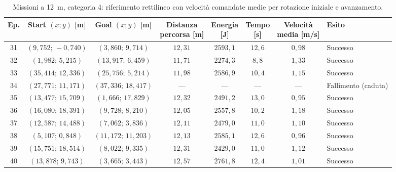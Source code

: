 \begin{table}[H]
\centering
\caption{Missioni a 12~m, categoria 4: riferimento rettilineo con velocità comandate medie per rotazione iniziale e avanzamento.}
\label{tab:big-map-12m-baseline-cat4}
\begingroup
\fontsize{9}{11}\selectfont
\setlength{\tabcolsep}{2.5pt}
\renewcommand{\arraystretch}{1.2}
\begin{tabular}{@{}c cc cccc l@{}}
\toprule
Ep. & \shortstack{Start $(x;y)$\\{}[m]} & \shortstack{Goal $(x;y)$\\{}[m]} & \shortstack{Distanza\\percorsa [m]} & \shortstack{Energia\\{}[J]} & \shortstack{Tempo\\{}[s]} & \shortstack{Velocità\\media [m/s]} & Esito \\
\midrule
31 & $(9{,}752;\,-0{,}740)$ & $(3{,}860;\,9{,}714)$ & $12{,}31$ & $2593{,}1$ & $12{,}6$ & $0{,}98$ & Successo \\
32 & $(1{,}982;\,5{,}215)$ & $(13{,}917;\,6{,}459)$ & $11{,}71$ & $2274{,}3$ & $8{,}8$ & $1{,}33$ & Successo \\
33 & $(35{,}414;\,12{,}336)$ & $(25{,}756;\,5{,}214)$ & $11{,}98$ & $2586{,}9$ & $10{,}4$ & $1{,}15$ & Successo \\
34 & $(27{,}771;\,11{,}171)$ & $(37{,}336;\,18{,}417)$ & --- & --- & --- & --- & Fallimento (caduta) \\
35 & $(13{,}477;\,15{,}709)$ & $(1{,}666;\,17{,}829)$ & $12{,}32$ & $2491{,}2$ & $13{,}0$ & $0{,}95$ & Successo \\
36 & $(16{,}080;\,18{,}391)$ & $(9{,}728;\,8{,}210)$ & $12{,}05$ & $2557{,}8$ & $10{,}2$ & $1{,}18$ & Successo \\
37 & $(12{,}587;\,14{,}488)$ & $(7{,}062;\,3{,}836)$ & $12{,}11$ & $2479{,}0$ & $11{,}0$ & $1{,}10$ & Successo \\
38 & $(5{,}107;\,0{,}848)$ & $(11{,}172;\,11{,}203)$ & $12{,}13$ & $2585{,}1$ & $12{,}6$ & $0{,}96$ & Successo \\
39 & $(15{,}751;\,18{,}514)$ & $(8{,}022;\,9{,}335)$ & $12{,}31$ & $2429{,}0$ & $11{,}0$ & $1{,}12$ & Successo \\
40 & $(13{,}878;\,9{,}743)$ & $(3{,}665;\,3{,}443)$ & $12{,}57$ & $2761{,}8$ & $12{,}4$ & $1{,}01$ & Successo \\
\bottomrule
\end{tabular}
\endgroup
\end{table}
